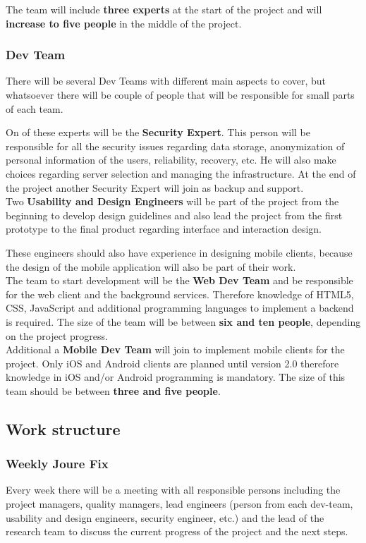 \documentclass[a4paper,11pt]{article}
\begin{document}
The team will include \textbf{three experts} at the start of the project and will \textbf{increase to five people} in the middle of the project. 

\subsubsection{Dev Team}
There will be several Dev Teams with different main aspects to cover, but whatsoever there will be couple of people that will be responsible for small parts of each team.

On of these experts will be the \textbf{Security Expert}. This person will be responsible for all the security issues regarding data storage, anonymization of personal information of the users, reliability, recovery, etc. He will also make choices regarding server selection and managing the infrastructure. At the end of the project another Security Expert will join as backup and support. \\

Two \textbf{Usability and Design Engineers} will be part of the project from the beginning to develop design guidelines and also lead the project from the first prototype to the final product regarding interface and interaction design.

These engineers should also have experience in designing mobile clients, because the design of the mobile application will also be part of their work. \\

The team to start development will be the \textbf{Web Dev Team} and be responsible for the web client and the background services. Therefore knowledge of HTML5, CSS, JavaScript and additional programming languages to implement a backend is required. The size of the team will be between \textbf{six and ten people}, depending on the project progress. \\

Additional a \textbf{Mobile Dev Team} will join to implement mobile clients for the project. Only iOS and Android clients are planned until version 2.0 therefore knowledge in iOS and/or Android programming is mandatory. The size of this team should be between \textbf{three and five people}.

\subsection{Work structure}

\subsubsection{Weekly Joure Fix}
Every week there will be a meeting with all responsible persons including the project managers, quality managers, lead engineers (person from each dev-team, usability and design engineers, security engineer, etc.) and the lead of the research team to discuss the current progress of the project and the next steps.
\end{document}
